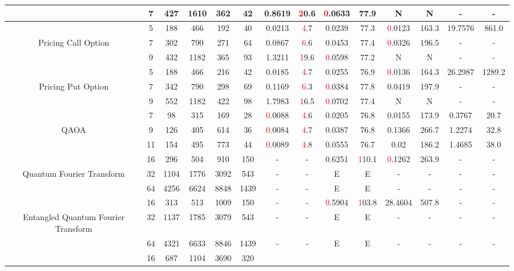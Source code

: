 \begin{table}[htb]
{\begin{tabular}{|c|c|c|c|c|c|c|c|c|c|c|c|c|c|}
 & 
7 & 427 & 1610 & 362 & 42
 & 0.8619 & \textcolor{red}20.6
 & \textcolor{red}0.0633 & 77.9
 & N & N 
 & - & -
 \\
\hline
 & 
5 & 188 & 466 & 192 & 40
 & 0.0213 & \textcolor{red}4.7
 & 0.0239 & 77.3
 & \textcolor{red}0.0123 & 163.3
 & 19.7576 & 861.0
 \\
Pricing Call Option & 
7 & 302 & 790 & 271 & 64
 & 0.0867 & \textcolor{red}6.6
 & 0.0453 & 77.4
 & \textcolor{red}0.0326 & 196.5
 & - & -
 \\
 & 
9 & 432 & 1182 & 365 & 93
 & 1.3211 & \textcolor{red}19.6
 & \textcolor{red}0.0598 & 77.2
 & N & N 
 & - & -
 \\
\hline
 & 
5 & 188 & 466 & 216 & 42
 & 0.0185 & \textcolor{red}4.7
 & 0.0255 & 76.9
 & \textcolor{red}0.0136 & 164.3
 & 26.2987 & 1289.2
 \\
Pricing Put Option & 
7 & 342 & 790 & 298 & 69
 & 0.1169 & \textcolor{red}6.3
 & \textcolor{red}0.0384 & 77.8
 & 0.0419 & 197.9
 & - & -
 \\
 & 
9 & 552 & 1182 & 422 & 98
 & 1.7983 & \textcolor{red}16.5
 & \textcolor{red}0.0702 & 77.4
 & N & N 
 & - & -
 \\
\hline
 & 
7 & 98 & 315 & 169 & 28
 & \textcolor{red}0.0088 & \textcolor{red}4.6
 & 0.0205 & 76.8
 & 0.0155 & 173.9
 & 0.3767 & 20.7
 \\
QAOA & 
9 & 126 & 405 & 614 & 36
 & \textcolor{red}0.0084 & \textcolor{red}4.7
 & 0.0387 & 76.8
 & 0.1366 & 266.7
 & 1.2274 & 32.8
 \\
 & 
11 & 154 & 495 & 773 & 44
 & \textcolor{red}0.0089 & \textcolor{red}4.8
 & 0.0555 & 76.7
 & 0.02 & 186.2
 & 1.4685 & 38.0
 \\
\hline
 & 
16 & 296 & 504 & 910 & 150
 & - & -
 & 0.6251 & \textcolor{red}110.1
 & \textcolor{red}0.1262 & 263.9
 & - & -
 \\
Quantum Fourier Transform & 
32 & 1104 & 1776 & 3092 & 543
 & - & -
 & E & E
 & - & -
 & - & -
 \\
 & 
64 & 4256 & 6624 & 8848 & 1439
 & - & -
 & E & E
 & - & -
 & - & -
 \\
\hline
 & 
16 & 313 & 513 & 1009 & 150
 & - & -
 & \textcolor{red}0.5904 & \textcolor{red}103.8
 & 28.4604 & 507.8
 & - & -
 \\
Entangled Quantum Fourier Transform & 
32 & 1137 & 1785 & 3079 & 543
 & - & -
 & E & E
 & - & -
 & - & -
 \\
 & 
64 & 4321 & 6633 & 8846 & 1439
 & - & -
 & E & E
 & - & -
 & - & -
 \\
\hline
 & 
16 & 687 & 1104 & 3690 & 320

\end{tabular}}
\end{table}
